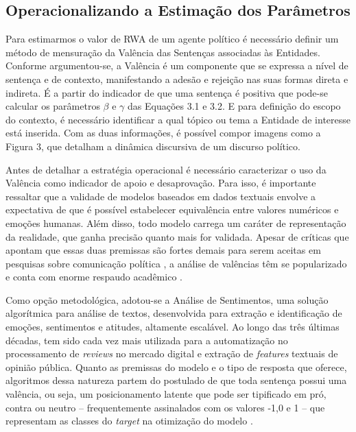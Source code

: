 \documentclass[
12pt,				%
openright,			%
twoside,			%
a4paper,			%
english,			%
french,				%
spanish,			%
brazil				%
]{abntex2}
\begin{document}
\subsection{Operacionalizando a Estimação dos Parâmetros}

Para estimarmos o valor de RWA de um agente político é necessário definir um método de mensuração da Valência das Sentenças associadas às Entidades. Conforme argumentou-se, a Valência é um componente que se expressa a nível de sentença e de contexto, manifestando a adesão e rejeição nas suas formas direta e indireta. É a partir do indicador de que uma sentença é positiva que pode-se calcular os parâmetros $\beta$ e $\gamma$ das Equações 3.1 e 3.2. E para definição do escopo do contexto, é necessário identificar a qual tópico ou tema a Entidade de interesse está inserida. Com as duas informações, é possível compor imagens como a Figura 3, que detalham a dinâmica discursiva de um discurso político.

Antes de detalhar a estratégia operacional é necessário caracterizar o uso da Valência como indicador de apoio e desaprovação. Para isso, é importante ressaltar que a validade de modelos baseados em dados textuais envolve a expectativa de que é possível estabelecer equivalência entre valores numéricos e emoções humanas. Além disso, todo modelo carrega um caráter de representação da realidade, que ganha precisão quanto mais for validada. Apesar de críticas que apontam que essas duas premissas são fortes demais para serem aceitas em pesquisas sobre comunicação política \cite{miguel2015vale}, a análise de valências têm se popularizado e conta com enorme respaudo acadêmico \cite{feres2016analise}.      

Como opção metodológica, adotou-se a Análise de Sentimentos, uma solução algorítmica para análise de textos, desenvolvida para extração e identificação de emoções, sentimentos e atitudes, altamente escalável. Ao longo das três últimas décadas, tem sido cada vez mais utilizada para a automatização no processamento de \emph{reviews} no mercado digital e extração de \emph{features} textuais de opinião pública. Quanto as premissas do modelo e o tipo de resposta que oferece, algoritmos dessa natureza partem do postulado de que toda sentença possui uma valência, ou seja, um posicionamento latente que pode ser tipificado em pró, contra ou neutro -- frequentemente assinalados com os valores -1,0 e 1 -- que representam as classes do \emph{target} na otimização do modelo \cite{serrano2015sentiment, mantyla2018evolution}.  
\end{document}
